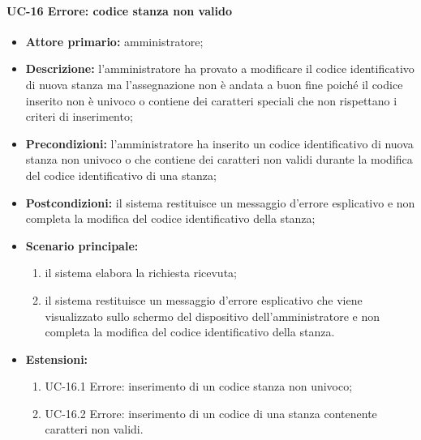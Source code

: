 \paragraph{UC-16 Errore: codice stanza non valido}
\begin{itemize}
	\item \textbf{Attore primario:} amministratore;
	\item \textbf{Descrizione:} l'amministratore ha provato a modificare il codice identificativo di nuova stanza ma l'assegnazione non è andata a buon fine poiché il codice inserito non è univoco o contiene dei caratteri speciali che non rispettano i criteri di inserimento;
	\item \textbf{Precondizioni:} l'amministratore ha inserito un codice identificativo di nuova stanza non univoco o che contiene dei caratteri non validi durante la modifica del codice identificativo di una stanza;
	\item \textbf{Postcondizioni:} il sistema restituisce un messaggio d'errore esplicativo e non completa la modifica del codice identificativo della stanza;
	\item \textbf{Scenario principale:}
	      \begin{enumerate}
		      \item il sistema elabora la richiesta ricevuta;
		      \item il sistema restituisce un messaggio d'errore esplicativo che viene visualizzato sullo schermo del dispositivo dell'amministratore e non completa la modifica del codice identificativo della stanza.
	      \end{enumerate}
	 \item \textbf{Estensioni:}
	 	\begin{enumerate}
		       \item UC-16.1 Errore: inserimento di un codice stanza non univoco;
		       \item UC-16.2 Errore: inserimento di un codice di una stanza contenente caratteri non validi.
	        \end{enumerate}
\end{itemize}


